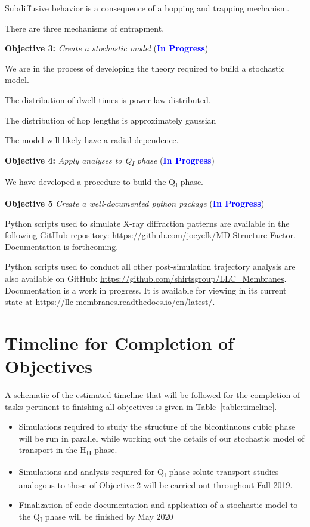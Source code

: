 \documentclass{article}
\begin{document}
  \noindent Subdiffusive behavior is a consequence of a hopping and trapping mechanism.
  
  \noindent There are three mechanisms of entrapment.
  
  \noindent \textbf{\large Objective 3:} \textit{\large Create a stochastic model} (\textcolor{blue}{\textbf{In Progress}})
  
  \noindent We are in the process of developing the theory required to build a 
  stochastic model. 
  
  \noindent The distribution of dwell times is power law distributed.
  
  \noindent The distribution of hop lengths is approximately gaussian
  
  \noindent The model will likely have a radial dependence. 
  
  \noindent \textbf{\large Objective 4:} \textit{\large Apply analyses to Q\textsubscript{I} phase} (\textcolor{blue}{\textbf{In Progress}})
  
  \noindent We have developed a procedure to build the Q\textsubscript{I} phase.
  
  \noindent \textbf{\large Objective 5} \textit{\large Create a well-documented python package} (\textcolor{blue}{\textbf{In Progress}})
  
  Python scripts used to simulate X-ray diffraction patterns are available in the following
  GitHub repository: \url{https://github.com/joeyelk/MD-Structure-Factor}. Documentation
  is forthcoming. 
  
  Python scripts used to conduct all other post-simulation trajectory analysis are 
  also available on GitHub: \url{https://github.com/shirtsgroup/LLC_Membranes}. 
  Documentation is a work in progress. It is available for viewing in its 
  current state at \url{https://llc-membranes.readthedocs.io/en/latest/}.

  \section{Timeline for Completion of Objectives}\label{section:timeline}

  A schematic of the estimated timeline that will be followed for the completion of
  tasks pertinent to finishing all objectives is given in Table~\ref{table:timeline}.
  \begin{itemize}
    \item Simulations required to study the structure of the bicontinuous cubic
    phase will be run in parallel while working out the details of our stochastic
    model of transport in the H\textsubscript{II} phase.
    \item Simulations and analysis required for Q\textsubscript{I} phase solute 
    transport studies analogous to those of Objective 2 will be carried out 
    throughout Fall 2019.
    \item Finalization of code documentation and application of a stochastic
    model to the Q\textsubscript{I} phase will be finished by May 2020
  \end{itemize}
\end{document}
